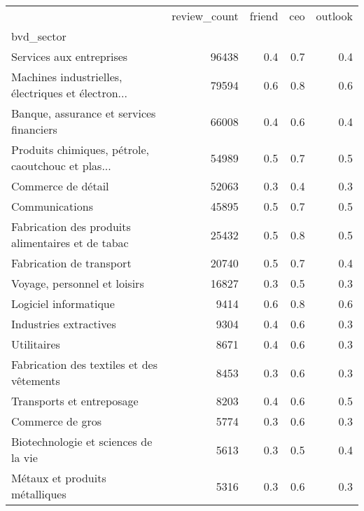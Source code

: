 \begin{tabular}{lrrrr}
\toprule
{} &  review\_count &  friend &  ceo &  outlook \\
bvd\_sector                                         &               &         &      &          \\
\midrule
Services aux entreprises                           &         96438 &     0.4 &  0.7 &      0.4 \\
Machines industrielles, électriques et électron... &         79594 &     0.6 &  0.8 &      0.6 \\
Banque, assurance et services financiers           &         66008 &     0.4 &  0.6 &      0.4 \\
Produits chimiques, pétrole, caoutchouc et plas... &         54989 &     0.5 &  0.7 &      0.5 \\
Commerce de détail                                 &         52063 &     0.3 &  0.4 &      0.3 \\
Communications                                     &         45895 &     0.5 &  0.7 &      0.5 \\
Fabrication des produits alimentaires et de tabac  &         25432 &     0.5 &  0.8 &      0.5 \\
Fabrication de transport                           &         20740 &     0.5 &  0.7 &      0.4 \\
Voyage, personnel et loisirs                       &         16827 &     0.3 &  0.5 &      0.3 \\
Logiciel informatique                              &          9414 &     0.6 &  0.8 &      0.6 \\
Industries extractives                             &          9304 &     0.4 &  0.6 &      0.3 \\
Utilitaires                                        &          8671 &     0.4 &  0.6 &      0.3 \\
Fabrication des textiles et des vêtements          &          8453 &     0.3 &  0.6 &      0.3 \\
Transports et entreposage                          &          8203 &     0.4 &  0.6 &      0.5 \\
Commerce de gros                                   &          5774 &     0.3 &  0.6 &      0.3 \\
Biotechnologie et sciences de la vie               &          5613 &     0.3 &  0.5 &      0.4 \\
Métaux et produits métalliques                     &          5316 &     0.3 &  0.6 &      0.3 \\

\end{tabular}
